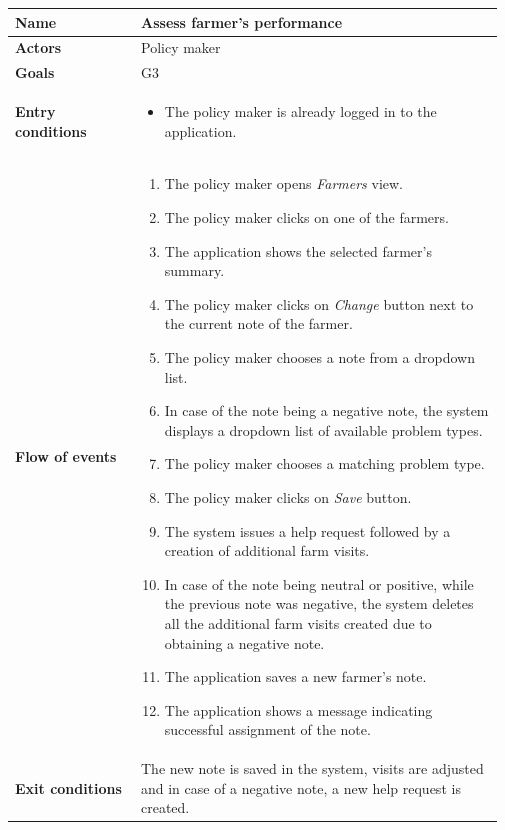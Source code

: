 \begin{table}[H]
    \centering
	\begin{tabular}{@{}p{0.25\linewidth} p{0.72\linewidth}@{}}
\toprule
		\textbf{Name}               & Assess farmer's performance\\
		\midrule
		\textbf{Actors}             & Policy maker\\
		\midrule
		\textbf{Goals}              & G3 \\
		\midrule
		
		\textbf{Entry conditions}   & \begin{itemize}[leftmargin=.4cm,noitemsep,topsep=0pt,before=\vspace{-3mm},after=\vspace{-4mm}]
		    \item The policy maker is already logged in to the application.
		\end{itemize}\\
		\midrule
		
		\textbf{Flow of events}     & \begin{enumerate}[leftmargin=.4cm,noitemsep,topsep=0pt,before=\vspace{-3mm},after=\vspace{-4mm}]
		    \item The policy maker opens \textit{Farmers} view.
		    \item The policy maker clicks on one of the farmers.
		    \item The application shows the selected farmer's summary.
		    \item The policy maker clicks on \textit{Change} button next to the current note of the farmer.
		    \item The policy maker chooses a note from a dropdown list.
		    \item In case of the note being a negative note, the system displays a dropdown list of available problem types.
		    \item The policy maker chooses a matching problem type.
		    \item The policy maker clicks on \textit{Save} button.
		    \item The system issues a help request followed by a creation of additional farm visits.
		    \item In case of the note being neutral or positive, while the previous note was negative, the system deletes all the additional farm visits created due to obtaining a negative note.
		    \item The application saves a new farmer's note.
		    \item The application shows a message indicating successful assignment of the note.
		\end{enumerate}\\
		\midrule
		\textbf{Exit conditions}    & The new note is saved in the system, visits are adjusted and in case of a negative note, a new help request is created.  \\
		\midrule
		

\end{tabular}
\end{table}
